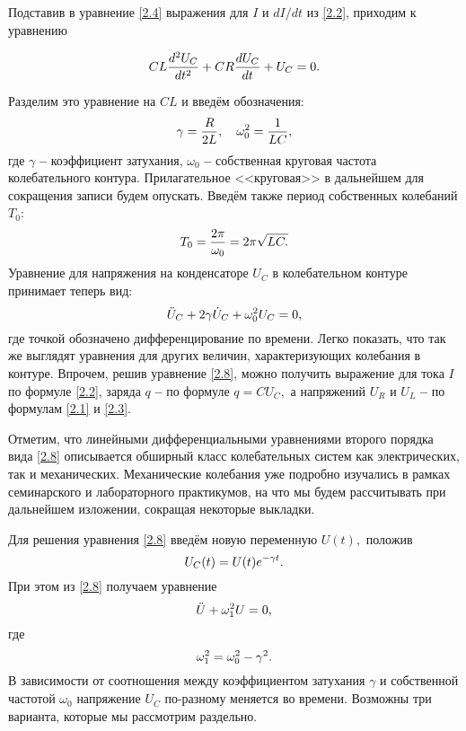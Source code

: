 Подставив в уравнение \eqref{2.4} выражения для $I$ и $dI/dt$ из \eqref{2.2}, приходим к уравнению

\begin{equation}\eqmark{2.5}
CL\dfrac{d^2U_C}{dt^2}+CR\dfrac{dU_C}{dt}+U_C=0.
\end{equation}

Разделим это уравнение на $CL$ и введём обозначения:
\begin{equation}\eqmark{2.6}
\gamma=\dfrac{R}{2L},~~~\omega_0^2=\dfrac{1}{LC},
\end{equation}
где $\gamma$ \textbf{--} \textsf{коэффициент затухания,} $\omega_0$ \textbf{--}  \textsf{собственная круговая частота} колебательного контура. Прилагательное  \textsf{<<круговая>>} в дальнейшем для сокращения записи будем опускать. Введём также  \textsf{период собственных колебаний $T_0$:}
\begin{equation}\eqmark{2.7}
T_0=\dfrac{2\pi}{\omega_0}=2\pi\sqrt{LC.}
\end{equation}
Уравнение для напряжения на конденсаторе $U_C$ в колебательном контуре принимает теперь вид:
\begin{equation}\eqmark{2.8}
\ddot{U}_C+2\gamma\dot{U}_C+\omega_0^2U_C=0,
\end{equation}
где точкой обозначено дифференцирование по времени. Легко показать, что так же выглядят уравнения для других величин, характеризующих колебания в контуре. Впрочем, решив уравнение \eqref{2.8}, можно получить выражение для тока $I$ по формуле \eqref{2.2}, заряда $q$ \textbf{--} по формуле $q=CU_C,$ а напряжений $U_R$ и $U_L$ \textbf{--} по формулам \eqref{2.1} и \eqref{2.3}.

Отметим, что линейными дифференциальными уравнениями второго порядка вида \eqref{2.8} описывается обширный класс колебательных систем как электрических, так и механических. Механические колебания уже подробно изучались в рамках семинарского и лабораторного практикумов, на что мы будем рассчитывать при дальнейшем изложении, сокращая некоторые выкладки.

Для решения уравнения \eqref{2.8} введём новую переменную $U(t),$ положив 
\begin{equation}\eqmark{2.9}
U_C(t)=U(t)e^{-\gamma t}.
\end{equation}
При этом из \eqref{2.8} получаем уравнение
\begin{equation}\eqmark{2.10}
\ddot{U}+\omega_1^2U=0,
\end{equation}
где
\begin{equation}\eqmark{2.11}
\omega_1^2=\omega_0^2-\gamma^2.
\end{equation}
В зависимости от соотношения между коэффициентом затухания $\gamma$ и собственной частотой $\omega_0$ напряжение $U_C$ по-разному меняется во времени. Возможны три варианта, которые мы рассмотрим раздельно.

